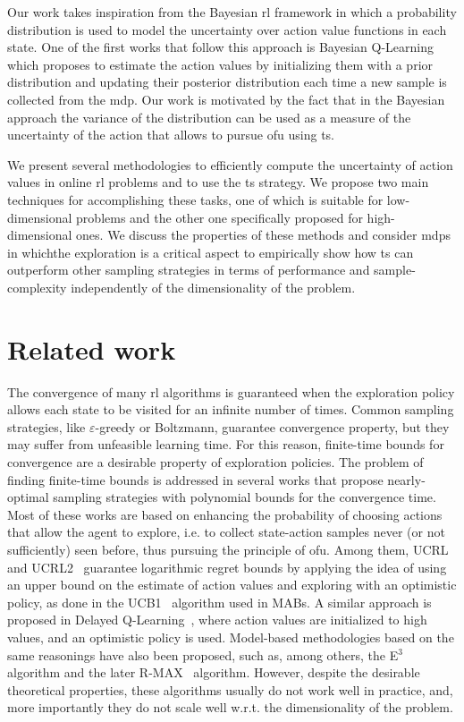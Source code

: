 Our work takes inspiration from the Bayesian \gls{rl} framework in which a probability distribution is used to model the uncertainty over action value functions in each state. One of the first works that follow this approach is Bayesian Q-Learning~\cite{dearden1998bayesian} which proposes to estimate the action values by initializing them with a prior distribution and updating their posterior distribution each time a new sample is collected from the \gls{mdp}. Our work is motivated by the fact that in the Bayesian approach the variance of the distribution can be used as a measure of the uncertainty of the action that allows to pursue \gls{ofu} using \gls{ts}.

We present several methodologies to efficiently compute the uncertainty of action values in online \gls{rl} problems and to use the \gls{ts} strategy. We propose two main techniques for accomplishing these tasks, one of which is suitable for low-dimensional problems and the other one specifically proposed for high-dimensional ones. We discuss the properties of these methods and consider \glspl{mdp} in whichthe exploration is a critical aspect to empirically show how \gls{ts} can outperform other sampling strategies in terms of performance and sample-complexity independently of the dimensionality of the problem. 

\section{Related work}
The convergence of many \gls{rl} algorithms is guaranteed when the exploration policy allows each state to be visited for an infinite number of times. Common sampling strategies, like $\varepsilon$-greedy or Boltzmann, guarantee convergence property, but they may suffer from unfeasible learning time. For this reason, finite-time bounds for convergence are a desirable property of exploration policies. The problem of finding finite-time bounds is addressed in several works that propose nearly-optimal sampling strategies with polynomial bounds for the convergence time. Most of these works are based on enhancing the probability of choosing actions that allow the agent to explore, i.e. to collect state-action samples never (or not sufficiently) seen before, thus pursuing the principle of \gls{ofu}. Among them, UCRL~\cite{auer2007logarithmic} and UCRL2~\cite{jaksch2010near} guarantee logarithmic regret bounds by applying the idea of using an upper bound on the estimate of action values and exploring with an optimistic policy, as done in the UCB1~\cite{auer2002finite} algorithm used in MABs. A similar approach is proposed in Delayed Q-Learning~\cite{strehl2006pac}, where action values are initialized to high values, and an optimistic policy is used. Model-based methodologies based on the same reasonings have also been proposed, such as, among others, the E$^3$~\cite{kearns2002near} algorithm and the later R-MAX~\cite{brafman2002r} algorithm. However, despite the desirable theoretical properties, these algorithms usually do not work well in practice, and, more importantly they do not scale well w.r.t. the dimensionality of the problem.


